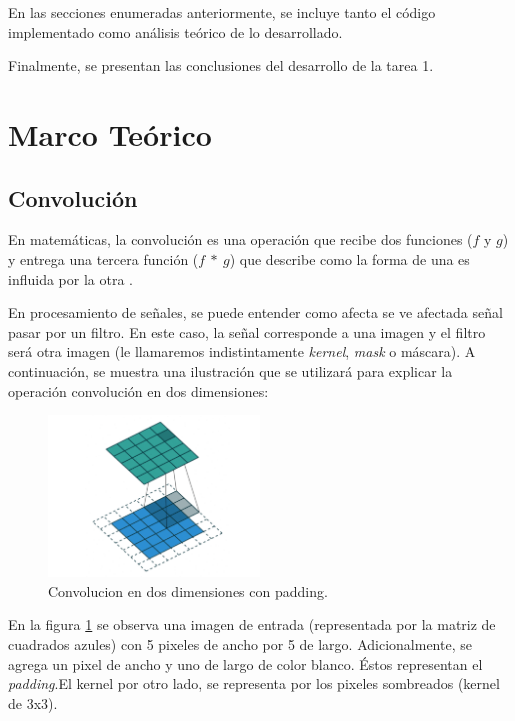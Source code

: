 \documentclass[12pt, letterpaper]{article}
\begin{document}
\par En las secciones enumeradas anteriormente, se incluye tanto el código implementado como análisis teórico de lo desarrollado. 

\par Finalmente, se presentan las conclusiones del desarrollo de la tarea 1. 

\newpage
\section{Marco Teórico}
\subsection{Convolución}

\par En matemáticas, la convolución es una operación que recibe dos funciones ($f$ y $g$) y entrega una tercera función ($f \: \ast \: g $) que describe como la forma de una es influida por la otra \cite{WikiConv}.
\par En procesamiento de señales, se puede entender como afecta se ve afectada señal  pasar por un filtro. En este caso, la señal corresponde a una imagen y el filtro será otra imagen (le llamaremos indistintamente \textit{kernel}, \textit{mask} o máscara). A continuación, se muestra una ilustración que se utilizará para explicar la operación convolución en dos dimensiones:

\begin{figure}[H]
  \centering
  \includegraphics[width = 0.5\textwidth]{conv2d.png}
  \caption{Convolucion en dos dimensiones con padding.\cite{imConv2d}}
  \label{fig:conv2d}
\end{figure}

\par En la figura \ref{fig:conv2d} se observa una imagen de entrada (representada por la matriz de cuadrados azules) con 5 pixeles de ancho por 5 de largo. Adicionalmente, se agrega un pixel de ancho y uno de largo de color blanco. Éstos representan el \textit{padding}.El kernel por otro lado, se representa por los pixeles sombreados (kernel de 3x3).
\end{document}
